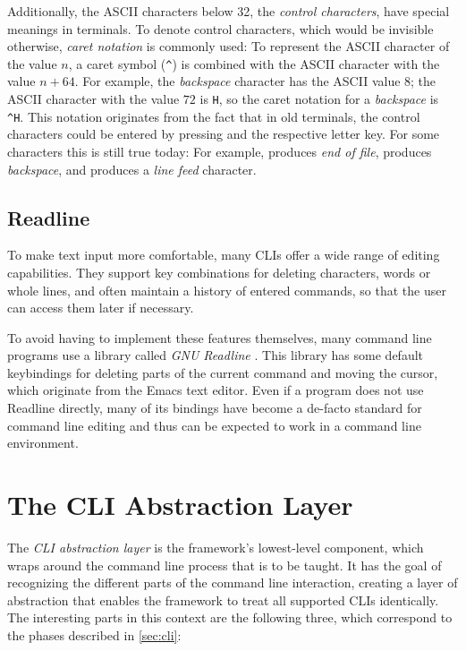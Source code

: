 \documentclass[paper=a4,twoside,abstract=on,cleardoublepage=empty,numbers=noenddot,toc=bib,12pt,appendixprefix=true]{scrreprt}
\newcommand{\escape}[1]{\textasciicircum #1}
\begin{document}
Additionally, the \textsc{ASCII} characters below 32, the \emph{control characters}, have special meanings in terminals.
To denote control characters, which would be invisible otherwise, \emph{caret notation} is commonly used: To represent the \textsc{ASCII} character of the value $n$, a caret symbol (\texttt{\textasciicircum}) is combined with the \textsc{ASCII} character with the value $n+64$. For example, the \emph{backspace} character has the \textsc{ASCII} value $8$; the \textsc{ASCII} character with the value $72$ is \texttt{H}, so the caret notation for a \emph{backspace} is \texttt{\escape{H}}. This notation originates from the fact that in old terminals, the control characters could be entered by pressing \keys{\ctrl} and the respective letter key. For some characters this is still true today: For example,  produces \emph{end of file},  produces \emph{backspace}, and  produces a \emph{line feed} character.

\section{Readline}

To make text input more comfortable, many CLIs offer a wide range of editing capabilities. They support key combinations for deleting characters, words or whole lines, and often maintain a history of entered commands, so that the user can access them later if necessary.

To avoid having to implement these features themselves, many command line programs use a library called \textsl{\textsc{GNU} Readline} \cite{readline}. This library has some default keybindings for deleting parts of the current command and moving the cursor, which originate from the Emacs text editor. Even if a program does not use Readline directly, many of its bindings have become a de-facto standard for command line editing and thus can be expected to work in a command line environment.

\chapter{The \textsc{CLI} Abstraction Layer}
\label{sec:cliparser}

The \textsl{\textsc{CLI} abstraction layer} is the framework's lowest-level component, which wraps around the command line process that is to be taught. It has the goal of recognizing the different parts of the command line interaction, creating a layer of abstraction that enables the framework to treat all supported \textsc{CLI}s identically. The interesting parts in this context are the following three, which correspond to the phases described in \cref{sec:cli}:
\end{document}
